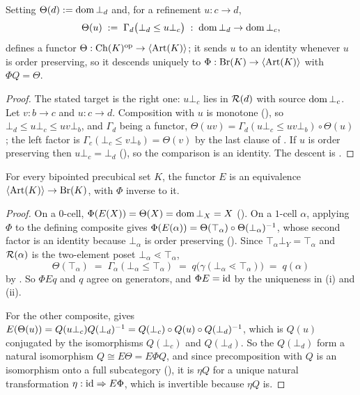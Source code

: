 \documentclass[11pt]{article}
\begin{document}
\begin{lemma}\label{lem:theta}
  Setting $\Theta(d) := \operatorname{dom}\bot_d$ and, for a refinement $u : c \to d$,
  \[
    \Theta(u) \;:=\; \Gamma_d\bigl(\bot_d \le u\bot_c\bigr)
      \;:\; \operatorname{dom}\bot_d \to \operatorname{dom}\bot_c ,
  \]
  defines a functor $\Theta : \operatorname{Ch}(K)^{\mathrm{op}} \to \left\langle \operatorname{Art}(K) \right\rangle$; it sends $u$ to an identity whenever
  $u$ is order preserving, so it descends uniquely to $\Phi : \operatorname{Br}(K) \to \left\langle \operatorname{Art}(K) \right\rangle$ with
  $\Phi Q = \Theta$.
\end{lemma}
\begin{proof}
  The stated target is the right one: $u\bot_c$ lies in $\mathcal{R}(d)$ with source $\operatorname{dom}\bot_c$.
  Let $v : b \to c$ and $u : c \to d$. Composition with $u$ is monotone (), so
  $\bot_d \le u\bot_c \le uv\bot_b$, and $\Gamma_d$ being a functor,
  $\Theta(uv) = \Gamma_d(u\bot_c \le uv\bot_b) \circ \Theta(u)$; the left factor is
  $\Gamma_c(\bot_c \le v\bot_b) = \Theta(v)$ by the last clause of . If $u$
  is order preserving then $u\bot_c = \bot_d$ (), so the comparison is an identity.
  The descent is .
\end{proof}

\begin{theorem}\label{thm:A}
  For every bipointed precubical set $K$, the functor $E$ is an equivalence
  $\left\langle \operatorname{Art}(K) \right\rangle \to \operatorname{Br}(K)$, with $\Phi$ inverse to it.
\end{theorem}
\begin{proof}
  On a $0$-cell, $\Phi(E(X)) = \Theta(X) = \operatorname{dom}\bot_X = X$ (). On a $1$-cell
  $\alpha$, applying $\Phi$ to the defining composite gives
  $\Phi(E(\alpha)) = \Theta(\top_\alpha) \circ \Theta(\bot_\alpha)^{-1}$, whose second
  factor is an identity because $\bot_\alpha$ is order preserving (). Since
  $\top_\alpha\bot_Y = \top_\alpha$ and $\mathcal{R}(\alpha)$ is the two-element poset
  $\bot_\alpha \lessdot \top_\alpha$,
  \[
    \Theta(\top_\alpha) \;=\; \Gamma_\alpha(\bot_\alpha \le \top_\alpha)
      \;=\; q\bigl(\gamma(\bot_\alpha \lessdot \top_\alpha)\bigr) \;=\; q(\alpha)
  \]
  by . So $\Phi E q$ and $q$ agree on generators, and $\Phi E = \operatorname{id}$ by
  the uniqueness in (i) and (ii).

  For the other composite,  gives
  $E(\Theta(u)) = Q(u\bot_c)Q(\bot_d)^{-1}
   = Q(\bot_c) \circ Q(u) \circ Q(\bot_d)^{-1}$, which is $Q(u)$ conjugated by the isomorphisms
  $Q(\bot_c)$ and $Q(\bot_d)$. So the $Q(\bot_d)$ form a natural isomorphism $Q \cong E\Theta = E\Phi Q$,
  and since precomposition with $Q$ is an isomorphism onto a full subcategory (),
  it is $\eta Q$ for a unique natural transformation $\eta : \operatorname{id} \Rightarrow E\Phi$, which is
  invertible because $\eta Q$ is.
\end{proof}
\end{document}
